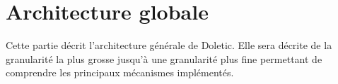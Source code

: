 \chapter{Architecture globale}

Cette partie décrit l'architecture générale de Doletic. Elle sera décrite de la granularité la plus grosse jusqu'à une granularité plus fine permettant de comprendre les principaux mécanismes implémentés.